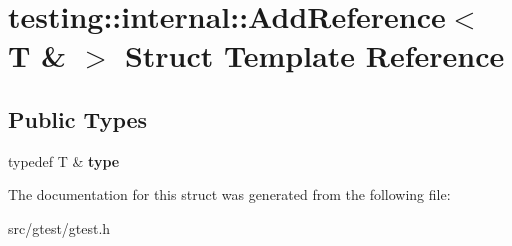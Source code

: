 \hypertarget{structtesting_1_1internal_1_1_add_reference_3_01_t_01_6_01_4}{}\section{testing\+:\+:internal\+:\+:Add\+Reference$<$ T \& $>$ Struct Template Reference}
\label{structtesting_1_1internal_1_1_add_reference_3_01_t_01_6_01_4}
\subsection*{Public Types}
\begin{DoxyCompactItemize}
\item 
\mbox{\label{structtesting_1_1internal_1_1_add_reference_3_01_t_01_6_01_4_a93c064cdcdaced0abd167258425e57af}} 
typedef T \& {\bfseries type}
\end{DoxyCompactItemize}


The documentation for this struct was generated from the following file\+:\begin{DoxyCompactItemize}
\item 
src/gtest/gtest.\+h\end{DoxyCompactItemize}
